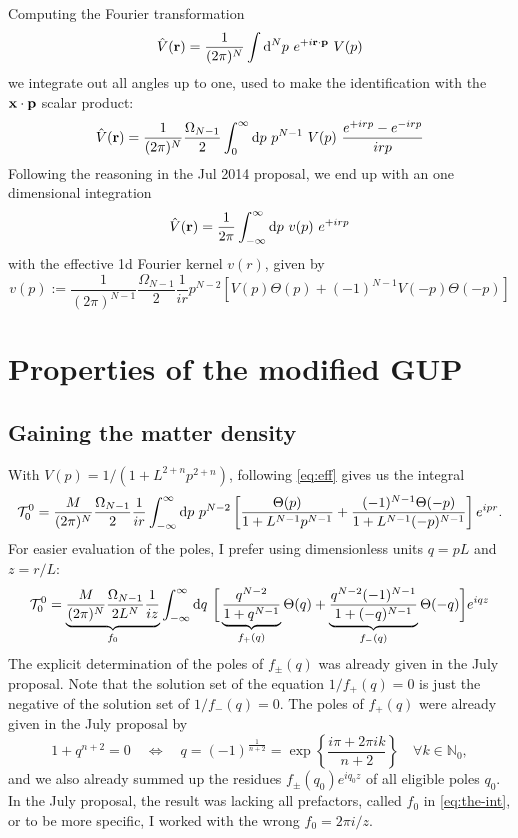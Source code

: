 \documentclass[10pt,a4paper]{article}
\begin{document}
Computing the Fourier transformation
\begin{equation}
\hat V(\mathbf{ r }) = \frac{1}{(2\pi)^N} \int \mathrm{d}^N p~e^{+i\mathbf{ r } \cdot \mathbf{ p }}~V(p)
\end{equation}
we integrate out all angles up to one, used to make the identification with the $\mathbf{ x } \cdot \mathbf{ p }$ scalar product:
\begin{equation}
\hat V(\mathbf{ r }) = \frac{1}{(2\pi)^N} \frac{\Omega_{N-1}}{2} 
\int_0^\infty \mathrm{d} p~p^{N-1}~V(p)~\frac{e^{+irp} - e^{-irp}}{irp}
\end{equation}
Following the reasoning in the Jul 2014 proposal, we end up with an one dimensional integration
\begin{equation}
\hat V(\mathbf{ r }) = \frac{1}{2\pi} \int_{-\infty}^\infty \mathrm{d} p~v(p)~e^{+irp}
\end{equation}
with the effective 1d Fourier kernel $v(r)$, given by
\begin{equation}\label{eq:eff}
v(p) := \frac{1}{(2\pi)^{N-1}} \frac{\Omega_{N-1}}{2} \frac{1}{ir} p^{N-2}
\left[ V(p)\Theta(p) +  (-1)^{N-1} V(-p)\Theta(-p) \right]
\end{equation}

\section{Properties of the modified GUP}
\subsection{Gaining the matter density}
With $V(p) = 1/(1 + L^{2+n} p^{2+n})$, following \eqref{eq:eff} gives us the integral
\begin{equation}
{\cal T}^0_0 =
\frac{M}{(2\pi)^N} \frac{\Omega_{N-1}}{2} \frac{1}{ir}
\int_{-\infty}^\infty \mathrm{d} p~p^{N-2}
\left[
\frac{\Theta(p)}{1 + L^{N-1} p^{N-1}} + 
\frac{(-1)^{N-1} \Theta(-p)}{1 + L^{N-1} (-p)^{N-1}}
\right] e^{ipr}.
\end{equation}
For easier evaluation of the poles, I prefer using dimensionless units $q=pL$ and $z=r/L$:
\begin{equation}\label{eq:the-int}
{\cal T}^0_0 =
\underbrace{\frac{M}{(2\pi)^N} \frac{\Omega_{N-1}}{2 L^{N}} \frac{1}{iz}}_{f_0}
\int_{-\infty}^\infty \mathrm{d} q~
\bigg[
\underbrace{\frac{q^{N-2}}{1 + q^{N-1}}}_{f_+(q)} \Theta(q) + 
\underbrace{\frac{q^{N-2} (-1)^{N-1}}{1 + (-q)^{N-1}}}_{f_-(q)}\Theta(-q)
\bigg] e^{iqz}
\end{equation}
The explicit determination of the poles of $f_\pm(q)$ was already given in the July proposal. Note
that the solution set of the equation $1/f_+(q)=0$ is just the negative of the solution set of 
$1/f_-(q)=0$.  The poles of $f_+(q)$ were already given in the July proposal by
\begin{equation} \label{eq:poles}
1 + q^{n+2} = 0
\quad\Leftrightarrow\quad
q = (-1)^{\frac 1{n+2}}
=\exp\left\{
\frac{i\pi + 2\pi i k}{n+2}
\right\}
\quad
\forall k\in \mathbb{N}_0,
\end{equation}
and we also already summed up the residues $f_\pm(q_0) e^{iq_0 z}$ of all eligible poles $q_0$.
In the July proposal, the result was lacking all prefactors, called $f_0$ in \eqref{eq:the-int}, or to
be more specific, I worked with the wrong $f_0=2\pi i/z$.
\end{document}
